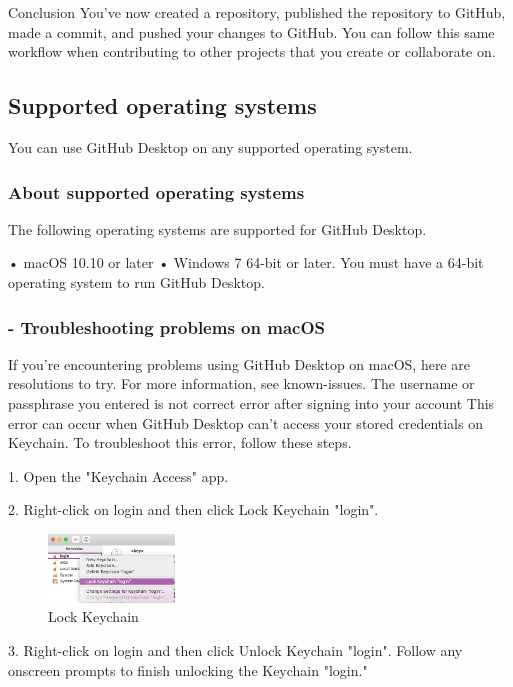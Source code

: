  
Conclusion
You've now created a repository, published the repository to GitHub, made a commit, and pushed your changes to GitHub. You can follow this same workflow when contributing to other projects that you create or collaborate on.

\subsection{ Supported operating systems}
You can use GitHub Desktop on any supported operating system.


\subsubsection{About supported operating systems}

The following operating systems are supported for GitHub Desktop.

•	macOS 10.10 or later
•	Windows 7 64-bit or later. You must have a 64-bit operating system to run GitHub Desktop.


\subsubsection{- Troubleshooting problems on macOS}

If you're encountering problems using GitHub Desktop on macOS, here are resolutions to try. For more information, see known-issues.
The username or passphrase you entered is not correct error after signing into your account
This error can occur when GitHub Desktop can't access your stored credentials on Keychain.
To troubleshoot this error, follow these steps.

1.	Open the "Keychain Access" app.


2.	Right-click on login and then click Lock Keychain "login".

\begin{figure}[ht]
    \centering
    \includegraphics[width=0.3\textwidth]{figures/Lock Keychain.png}
    \caption{Lock Keychain}
\end{figure}
 
 
3.	Right-click on login and then click Unlock Keychain "login". Follow any onscreen prompts to finish unlocking the Keychain "login."

